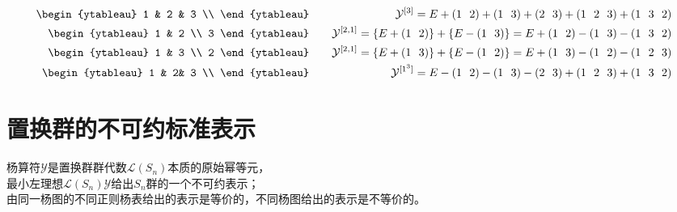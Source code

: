 \begin{example}[$S_3$群各不可约表示杨图对应的正则杨表的杨算符]
	\begin{equation}\begin{aligned}
	\begin{ytableau}
	1 & 2 & 3 \\
	\end{ytableau} &\quad&
	\mathcal{Y}^{[3]}=E+(1~~2)+(1~~3)+(2~~3)+(1~~2~~3)+(1~~3~~2)\\
	\begin{ytableau}
	1 & 2 \\
	3 
	\end{ytableau} &\quad&
	\mathcal{Y}^{[2,1]}=\{E+(1~~2)\}+\{E-(1~~3)\}
	=E+(1~~2)-(1~~3)-(1~~3~~2)\\
	\begin{ytableau}
	1 & 3 \\
	2 
	\end{ytableau} &\quad&
	\mathcal{Y}^{[2,1]}=\{E+(1~~3)\}+\{E-(1~~2)\}
	=E+(1~~3)-(1~~2)-(1~~2~~3)\\
	\begin{ytableau}
	1 & 2& 3 \\
	\end{ytableau} &\quad&
	\mathcal{Y}^{[1^3]}
	=E-(1~~2)-(1~~3)-(2~~3)+(1~~2~~3)+(1~~3~~2)
	\end{aligned}\end{equation}
\end{example}


\section{置换群的不可约标准表示}

\begin{newthem}[置换群的原始幂等元]
	{\color{seco}杨算符$\mathcal{Y}$是置换群群代数$\mathcal{L}(S_n)$本质的原始幂等元}，\\
	最小左理想$\mathcal{L}(S_n) \mathcal{Y}$给出$S_n$群的一个不可约表示；\\
	{\color{seco}由同一杨图的不同正则杨表给出的表示是等价的，不同杨图给出的表示是不等价的}。
	
\end{newthem}

